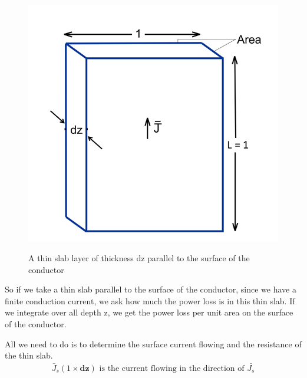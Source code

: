 \begin{figure}
\centering
\textsc{\includegraphics[scale=0.35]{graphics/slab_parallel_to_conducting_surface}}
\caption{A thin slab layer of thickness dz parallel to the surface of the conductor }
\end{figure}
So if we take a thin slab parallel to the surface of the conductor, since we have a finite conduction current, we ask how much the power loss is in this thin slab. If we integrate over all depth z, we get the power loss per unit area on the surface of the conductor.

All we need to do is to determine the surface current flowing and the resistance of the thin slab.
\begin{align*}
\bar{J}_s(1\times\mathbf{dz})\text{ is the current flowing in the direction of } \bar{J_{s}}
\end{align*}

